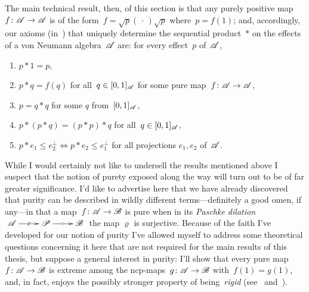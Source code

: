 \documentclass[a]{subfiles}
\begin{document}
\begin{point}
The main technical result, then, of this section
is that any purely positive map $f\colon\mathscr{A}\to\mathscr{A}$
is of the form~$f=\sqrt{p}(\,\cdot\,)\sqrt{p}$
where~$p=f(1)$;
and, accordingly, our axioms 
(in~)
that uniquely
determine the sequential product~$\ast$
on the effects of a von Neumann algebra~$\mathscr{A}$ are:
for every effect~$p$ of~$\mathscr{A}$,
\begin{enumerate}
\item
$p\ast 1=p$,
\item
$p\ast q = f(q)$
for all~$q\in [0,1]_{\mathscr{A}}$
for some pure map~$f\colon \mathscr{A}\to\mathscr{A}$,
\item
$p=q\ast q$ for some $q$ from~$[0,1]_{\mathscr{A}}$,
\item
$p \ast (p \ast q) = (p\ast p)\ast q$
for all~$q\in[0,1]_{\mathscr{A}}$,
\item
$p \ast e_1 \leq e_2^\perp\iff
p \ast e_2 \leq e_1^\perp$
for all projections $e_1,e_2$ of~$\mathscr{A}$.
\end{enumerate}%
While I would certainly not like
to undersell the results mentioned above
I suspect that the notion of purety exposed along the way
will turn out to be of far greater significance.
I'd like to advertise
here that we have already discovered that purity can be described in
wildly different terms---definitely a good omen, if any---in
that a map~$f\colon \mathscr{A}\to\mathscr{B}$ is pure when in its 
\emph{Paschke dilation} 
$\xymatrix{\scrA
	\ar[r]|-\varrho
&
	\scrP\ar[r]|-c
&
\scrB}$
the map $\varrho$ is surjective.
Because of the faith I've developed for our notion of purity I've allowed myself
to address some theoretical questions concerning it
here that are not required for the main results of this thesis,
but suppose a general interest in purity:
I'll show that every pure map~$f\colon\mathscr{A}\to\mathscr{B}$
is extreme among the ncp-maps~$g\colon \mathscr{A}\to\mathscr{B}$ with~$f(1)=g(1)$,
and, in fact, enjoys the possibly stronger property 
of being~\emph{rigid} (see~ and~).



\end{point}
\end{document}
